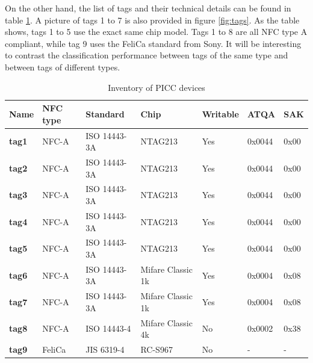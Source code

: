 On the other hand, the list of tags and their technical details can be found in table \ref{tab:picc-inventory}. A picture of tags 1 to 7 is also provided in figure \ref{fig:tags}. As the table shows, tags 1 to 5 use the exact same chip model. Tags 1 to 8 are all NFC type A compliant, while tag 9 uses the FeliCa standard from Sony. It will be interesting to contrast the classification performance between tags of the same type and between tags of different types.

\begin{table}[h!]
  \centering
  \begin{tabular}{|l|l|l|l|l|l|l|}
    \hline
    \textbf{Name} & \textbf{NFC type} & \textbf{Standard} & \textbf{Chip}     & \textbf{Writable} & \textbf{ATQA} & \textbf{SAK} \\ \hline
    \textbf{tag1} & NFC-A             & ISO 14443-3A      & NTAG213           & Yes               & 0x0044        & 0x00         \\ \hline
    \textbf{tag2} & NFC-A             & ISO 14443-3A      & NTAG213           & Yes               & 0x0044        & 0x00         \\ \hline
    \textbf{tag3} & NFC-A             & ISO 14443-3A      & NTAG213           & Yes               & 0x0044        & 0x00         \\ \hline
    \textbf{tag4} & NFC-A             & ISO 14443-3A      & NTAG213           & Yes               & 0x0044        & 0x00         \\ \hline
    \textbf{tag5} & NFC-A             & ISO 14443-3A      & NTAG213           & Yes               & 0x0044        & 0x00         \\ \hline \hline
    \textbf{tag6} & NFC-A             & ISO 14443-3A      & Mifare Classic 1k & Yes               & 0x0004        & 0x08         \\ \hline
    \textbf{tag7} & NFC-A             & ISO 14443-3A      & Mifare Classic 1k & Yes               & 0x0004        & 0x08         \\ \hline
    \textbf{tag8} & NFC-A             & ISO 14443-4       & Mifare Classic 4k & No                & 0x0002        & 0x38         \\ \hline
    \textbf{tag9} & FeliCa            & JIS 6319-4        & RC-S967           & No                & -             & -            \\ \hline
  \end{tabular}
  \caption{Inventory of PICC devices}
  \label{tab:picc-inventory}
\end{table}


